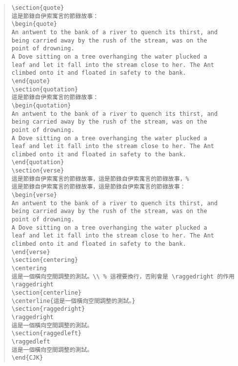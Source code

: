 \begin{quote}
\begin{verbatim}
\section{quote}
這是節錄自伊索寓言的節錄故事：
\begin{quote}
An antwent to the bank of a river to quench its thirst, and
being carried away by the rush of the stream, was on the
point of drowning.
A Dove sitting on a tree overhanging the water plucked a
leaf and let it fall into the stream close to her. The Ant
climbed onto it and floated in safety to the bank.
\end{quote}
\section{quotation}
這是節錄自伊索寓言的節錄故事：
\begin{quotation}
An antwent to the bank of a river to quench its thirst, and
being carried away by the rush of the stream, was on the
point of drowning.
A Dove sitting on a tree overhanging the water plucked a
leaf and let it fall into the stream close to her. The Ant
climbed onto it and floated in safety to the bank.
\end{quotation}
\section{verse}
這是節錄自伊索寓言的節錄故事，這是節錄自伊索寓言的節錄故事，%
這是節錄自伊索寓言的節錄故事，這是節錄自伊索寓言的節錄故事：
\begin{verse}
An antwent to the bank of a river to quench its thirst, and
being carried away by the rush of the stream, was on the
point of drowning.
A Dove sitting on a tree overhanging the water plucked a
leaf and let it fall into the stream close to her. The Ant
climbed onto it and floated in safety to the bank.
\end{verse}
\section{centering}
\centering
這是一個橫向空間調整的測試。\\ % 這裡要換行，否則會是 \raggedright 的作用
\raggedright
\section{centerline}
\centerline{這是一個橫向空間調整的測試。}
\section{raggedright}
\raggedright
這是一個橫向空間調整的測試。
\section{raggedleft}
\raggedleft
這是一個橫向空間調整的測試。
\end{CJK}

\end{verbatim}
\end{quote}

